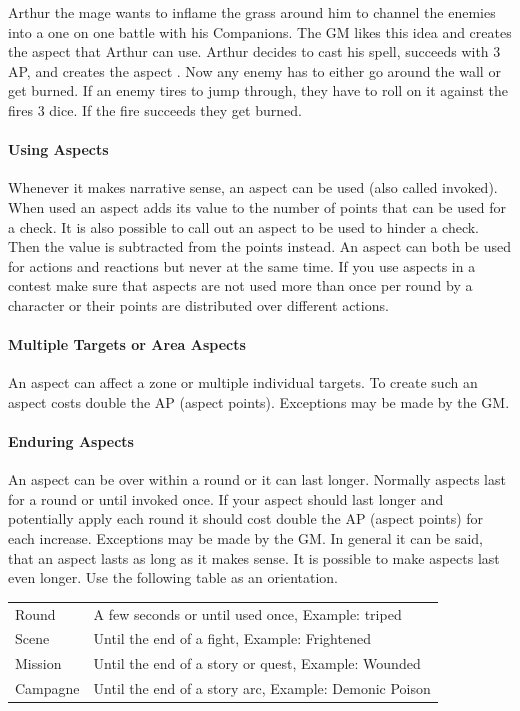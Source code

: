 \documentclass[11pt]{article}
\begin{document}
{\begin{pwexample}
Arthur the mage wants to inflame the grass around him to channel the enemies into a one on one battle with his Companions. The GM likes this idea and creates the aspect  that Arthur can use. Arthur decides to cast his spell, succeeds with 3 AP, and creates the aspect . Now any enemy has to either go around the wall or get burned. If an enemy tires to jump through, they have to roll on it against the fires 3 dice. If the fire succeeds they get burned.
\end{pwexample}
\paragraph*{Using Aspects}
\label{sec:orgd29707c}

Whenever it makes narrative sense, an aspect can be used (also called invoked). When used an aspect adds its value to the number of points that can be used for a check. It is also possible to call out an aspect to be used to hinder a check. Then the value is subtracted from the points instead. An aspect can both be used for actions and reactions but never at the same time. If you use  aspects in a contest make sure that aspects are not used more than once per round by a character or their points are distributed over different actions.
\paragraph*{Multiple Targets or Area Aspects}
\label{sec:orgd2556ec}
An aspect can affect a zone or multiple individual targets. To create such an aspect costs double the AP (aspect points). Exceptions may be made by the GM. 
\paragraph*{Enduring Aspects}
\label{sec:orgcdb4f3f}
An aspect can be over within a round or it can last longer. Normally aspects last for a round or until invoked once. If your aspect should last longer and potentially apply each round it should cost double the AP (aspect points) for each increase. Exceptions may be made by the GM. In general it can be said, that an aspect lasts as long as it makes sense. It is possible to make aspects last even longer. Use the following table as an orientation.
\begin{center}
\begin{tabular}{ll}
Round & A few seconds or until used once, Example: triped\\
Scene & Until the end of a fight, Example: Frightened\\
Mission & Until the end of a story or quest, Example: Wounded\\
Campagne & Until the end of a story arc, Example: Demonic Poison\\
\end{tabular}
\end{center}
}
\end{document}
